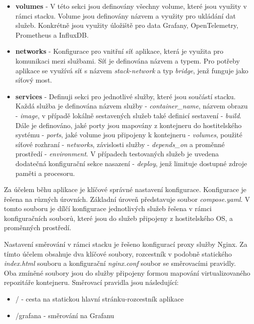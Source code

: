 \begin{itemize}
  \item \textbf{volumes} - V této sekci jsou definovány všechny volume, které jsou využity v rámci stacku. Volume jsou definovány názvem a využity pro ukládání dat služeb. Konkrétně jsou využity úložiště pro data Grafany, OpenTelemetry, Prometheus a InfluxDB.
  \item \textbf{networks} - Konfigurace pro vnitřní síť aplikace, která je využita pro komunikaci mezi službami. Síť je definována názvem a typem. Pro potřeby aplikace se využívá síť s názvem \emph{stack-network} a typ \emph{bridge}, jenž funguje jako síťový most.
  \item \textbf{services} - Definuji sekci pro jednotlivé služby, které jsou součástí stacku. Každá služba je definována názvem služby - \emph{container\_name}, názvem obrazu - \emph{image}, v případě lokálně sestavených služeb také definicí sestavení - \emph{build}. Dále je definováno, jaké porty jsou mapovány z kontejneru do hostitelského systému - \emph{ports}, jaké volume jsou připojeny k kontejneru - \emph{volumes}, použité síťové rozhraní - \emph{networks}, závislosti služby - \emph{depends\_on} a proměnné prostředí - \emph{environment}. V případech testovaných služeb je uvedena dodatečná konfigurační sekce nasazení - \emph{deploy}, jenž limituje dostupné zdroje paměti a procesoru.
\end{itemize}


Za účelem běhu aplikace je klíčové správné nastavení konfigurace. Konfigurace je řešena na různých úrovních. Základní úroveň představuje soubor \emph{compose.yaml}. V tomto souboru je dílčí konfigurace jednotlivých služeb řešena v rámci konfiguračních souborů, které jsou do služeb připojeny z hostitelského OS, a proměnných prostředí. 

Nastavení směrování v rámci stacku je řešeno konfigurací proxy služby Nginx. Za tímto účelem obsahuje dva klíčové soubory, rozcestník v podobně statického \emph{index.html} souboru a konfigurační \emph{nginx.conf} soubor se směrovacími pravidly. Oba zmíněné soubory jsou do služby připojeny formou mapování virtualizovaného repozitáře kontejneru. Směrovací pravidla jsou následující:

\begin{itemize}
    \item / - cesta na statickou hlavní stránku-rozcestník aplikace
    \item /grafana - směrování na Grafanu
\end{itemize}

